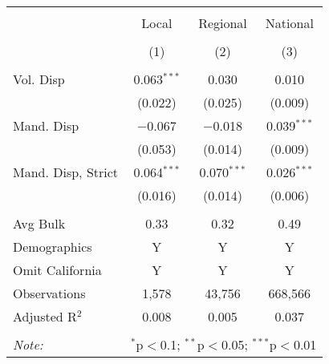 
\begin{table}[!htbp] \centering
  \caption{}
  \label{tab:unitPriceLawChain}
\begin{tabular}{@{\extracolsep{5pt}}lccc}
\\[-1.8ex]\hline
\hline \\[-1.8ex]
 & Local & Regional & National \\
\\[-1.8ex] & (1) & (2) & (3)\\
\hline \\[-1.8ex]
 Vol. Disp & 0.063$^{***}$ & 0.030 & 0.010 \\
  & (0.022) & (0.025) & (0.009) \\
  Mand. Disp & $-$0.067 & $-$0.018 & 0.039$^{***}$ \\
  & (0.053) & (0.014) & (0.009) \\
  Mand. Disp, Strict & 0.064$^{***}$ & 0.070$^{***}$ & 0.026$^{***}$ \\
  & (0.016) & (0.014) & (0.006) \\
 \hline \\[-1.8ex]
Avg Bulk & 0.33 & 0.32 & 0.49 \\
Demographics & Y & Y & Y \\
Omit California & Y & Y & Y \\
Observations & 1,578 & 43,756 & 668,566 \\
Adjusted R$^{2}$ & 0.008 & 0.005 & 0.037 \\
\hline
\hline \\[-1.8ex]
\textit{Note:}  & \multicolumn{3}{l}{$^{*}$p$<$0.1; $^{**}$p$<$0.05; $^{***}$p$<$0.01} \\
\end{tabular}
\end{table}
